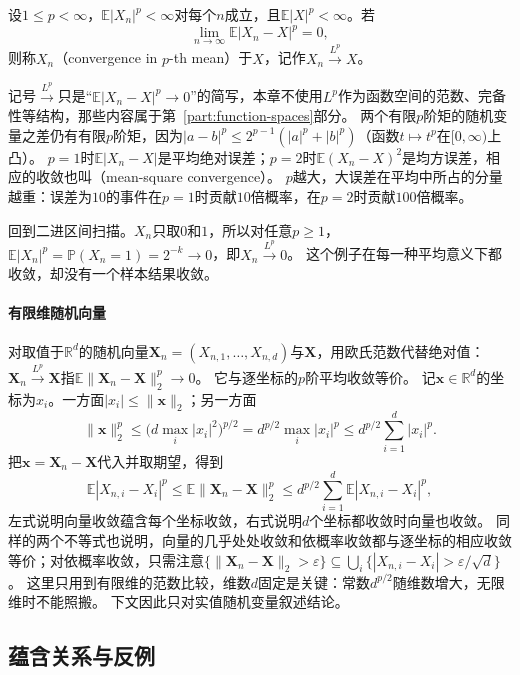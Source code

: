 \begin{definition}[$p$阶平均收敛]
\label{def:conv-mean}
设$1\leq p<\infty$，$\mathbb E|X_n|^p<\infty$对每个$n$成立，且$\mathbb E|X|^p<\infty$。若
\[
  \lim_{n\to\infty}\mathbb E|X_n-X|^p=0,
\]
则称$X_n$（convergence in $p$-th mean）于$X$，记作$X_n\xrightarrow{L^p}X$。
\end{definition}

记号$\xrightarrow{L^p}$只是“$\mathbb E|X_n-X|^p\to0$”的简写，本章不使用$L^p$作为函数空间的范数、完备性等结构，那些内容属于第~\ref{part:function-spaces}部分。
两个有限$p$阶矩的随机变量之差仍有有限$p$阶矩，因为$|a-b|^p\leq2^{p-1}(|a|^p+|b|^p)$（函数$t\mapsto t^p$在$[0,\infty)$上凸）。
$p=1$时$\mathbb E|X_n-X|$是平均绝对误差；$p=2$时$\mathbb E(X_n-X)^2$是均方误差，相应的收敛也叫（mean-square convergence）。
$p$越大，大误差在平均中所占的分量越重：误差为$10$的事件在$p=1$时贡献$10$倍概率，在$p=2$时贡献$100$倍概率。

回到二进区间扫描。$X_n$只取$0$和$1$，所以对任意$p\geq1$，$\mathbb E|X_n|^p=\mathbb P(X_n=1)=2^{-k}\to0$，即$X_n\xrightarrow{L^p}0$。
这个例子在每一种平均意义下都收敛，却没有一个样本结果收敛。

\paragraph{有限维随机向量}
对取值于$\mathbb R^d$的随机向量$\bm X_n=(X_{n,1},\ldots,X_{n,d})$与$\bm X$，用欧氏范数代替绝对值：$\bm X_n\xrightarrow{L^p}\bm X$指$\mathbb E\lVert\bm X_n-\bm X\rVert_2^p\to0$。
它与逐坐标的$p$阶平均收敛等价。
记$\bm x\in\mathbb R^d$的坐标为$x_i$。一方面$|x_i|\leq\lVert\bm x\rVert_2$；另一方面
\[
  \lVert\bm x\rVert_2^p\leq\bigl(d\max_i|x_i|^2\bigr)^{p/2}=d^{p/2}\max_i|x_i|^p\leq d^{p/2}\sum_{i=1}^d|x_i|^p.
\]
把$\bm x=\bm X_n-\bm X$代入并取期望，得到
\[
  \mathbb E|X_{n,i}-X_i|^p\leq\mathbb E\lVert\bm X_n-\bm X\rVert_2^p\leq d^{p/2}\sum_{i=1}^d\mathbb E|X_{n,i}-X_i|^p,
\]
左式说明向量收敛蕴含每个坐标收敛，右式说明$d$个坐标都收敛时向量也收敛。
同样的两个不等式也说明，向量的几乎处处收敛和依概率收敛都与逐坐标的相应收敛等价；对依概率收敛，只需注意$\{\lVert\bm X_n-\bm X\rVert_2>\varepsilon\}\subseteq\bigcup_i\{|X_{n,i}-X_i|>\varepsilon/\sqrt d\}$。
这里只用到有限维的范数比较，维数$d$固定是关键：常数$d^{p/2}$随维数增大，无限维时不能照搬。
下文因此只对实值随机变量叙述结论。

\subsection{蕴含关系与反例}

